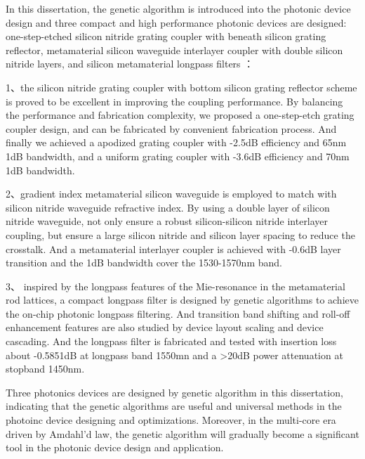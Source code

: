 In this dissertation, the genetic algorithm is introduced into the photonic device design and three compact and high performance photonic devices are designed: one-step-etched silicon nitride grating coupler with beneath silicon grating reflector, metamaterial silicon waveguide interlayer coupler with double silicon nitride layers, and silicon metamaterial longpass filters ：

1、the silicon nitride grating coupler with bottom silicon grating reflector scheme is proved to be excellent in improving the coupling performance. By balancing the performance and fabrication complexity, we proposed a one-step-etch grating coupler design, and can be fabricated by convenient fabrication process. And finally we achieved a apodized grating coupler with -2.5dB efficiency and 65nm 1dB bandwidth, and a uniform grating coupler with -3.6dB efficiency and 70nm 1dB bandwidth.

2、gradient index metamaterial silicon waveguide is employed to match with silicon nitride waveguide refractive index. By using a double layer of silicon nitride waveguide, not only ensure a robust silicon-silicon nitride interlayer coupling, but ensure a large silicon nitride and silicon layer spacing to reduce the crosstalk. And a metamaterial interlayer coupler is achieved with -0.6dB layer transition and the 1dB bandwidth cover the 1530-1570nm band.

3、 inspired by the longpass features of the Mie-resonance in the metamaterial rod lattices, a compact longpass filter is designed by genetic algorithms to achieve the on-chip photonic longpass filtering. And transition band shifting and roll-off enhancement features are also studied by device layout scaling and device cascading. And the longpass filter is fabricated and tested with insertion loss about -0.5851dB at longpass band 1550mn and a >20dB power attenuation at stopband 1450nm.

Three photonics devices are designed by genetic algorithm in this dissertation, indicating that the genetic algorithms are useful and universal methods in the photoinc device designing and optimizations. Moreover, in the multi-core era driven by Amdahl’d law, the genetic algorithm will gradually become a significant tool in the photonic device design and application.


